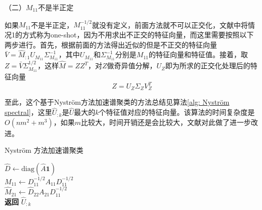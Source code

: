（二）$M_{11}$不是半正定

如果$M_{11}$不是半正定，$M_{11}^{-1/2}$就没有定义，前面方法就不可以正交化，文献\cite{fowlkes2004spectral}中将情况1的方式称为one-shot，因为不用求出不正交的特征向量，而这里需要按照以下两步进行。首先，根据前面的方法得出近似的但是不正交的特征向量$\bar{V} = \hat{M}_{:1}U_{M_{11}}\Sigma_{M_{11}}^{-1}$，其中$U_{M_{11}}$和$\Sigma_{M_{11}}^{-1}$分别是$M_{11}$的特征向量和特征值。接着，取$Z = \bar{V}\Sigma_{M_{11}}^{1/2}$，这样$\hat{M} = ZZ^T$，对$Z$做奇异值分解，$U_Z$即为所求的正交化处理后的特征向量
\begin{equation}
    Z = U_{Z}\Sigma_{Z}V_Z^T
\end{equation}

至此，这个基于Nyström方法加速谱聚类的方法总结见算法\ref{alg: Nyström spectral}，这里$\hat{U}_{:k}$是$\hat{U}$最大的$k$个特征值对应的特征向量。该算法的时间复杂度是$O(nm^2+m^3)$，如果$m$比较大，时间开销还是会比较大，文献\cite{li2011time,choromanska2013fast}对此做了进一步改进。
\begin{algorithm}[h]
    \caption{Nyström 方法加速谱聚类}\label{alg: Nyström spectral}
    $\hat{D} \gets \text{diag}(\hat{A}\mathbf{1})$\\
    $M_{11} \gets D_{11}^{-1/2}A_{11}D_{11}^{-1/2}$ \\
    $\hat{M}_{21} \gets \hat{D}_{22}A_{21}D_{11}^{-1/2}$ \\
    \textbf{返回} $\hat{U}_{:k}$
\end{algorithm}

